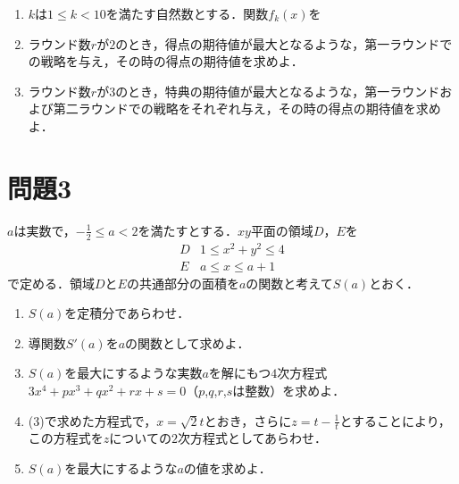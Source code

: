 \documentclass[unicode,12pt, A4j]{ltjsarticle}%
\begin{document}
\begin{enumerate}
 \item $k$は$1\le k < 10$を満たす自然数とする．関数$f_k(x)$を
 \item ラウンド数$r$が$2$のとき，得点の期待値が最大となるような，第一ラウンドでの戦略を与え，その時の得点の期待値を求めよ．
 \item ラウンド数$r$が$3$のとき，特典の期待値が最大となるような，第一ラウンドおよび第二ラウンドでの戦略をそれぞれ与え，その時の得点の期待値を求めよ．
\end{enumerate}

\section{問題3}
$a$は実数で，$-\frac{1}{2}\le a<2$を満たすとする．$xy$平面の領域$D$，$E$を
\begin{align*}
   D & 1\le x^2+y^2\le 4 \\
   E & a\le x \le a+1
\end{align*}
で定める．領域$D$と$E$の共通部分の面積を$a$の関数と考えて$S(a)$とおく．

\begin{enumerate}
 \item $S(a)$を定積分であらわせ．
 \item 導関数$S'(a)$を$a$の関数として求めよ．
 \item $S(a)$を最大にするような実数$a$を解にもつ$4$次方程式$3x^4+px^3+qx^2+rx+s=0$（$p$,$q$,$r$,$s$は整数）を求めよ．
 \item (3)で求めた方程式で，$x=\sqrt{2}t$とおき，さらに$z=t-\frac{1}{t}$とすることにより，この方程式を$z$についての$2$次方程式としてあらわせ．
 \item $S(a)$を最大にするような$a$の値を求めよ．
\end{enumerate}
\end{document}
